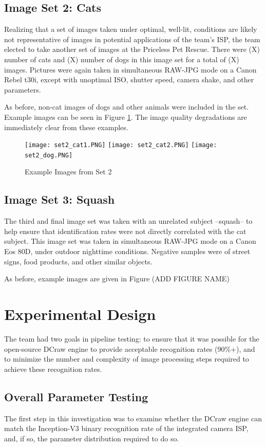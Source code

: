 \documentclass{report}
\begin{document}
		\subsection{Image Set 2: Cats}
		Realizing that a set of images taken under optimal, well-lit, conditions are likely not representative of images in potential applications of the team's ISP, the team elected to take another set of images at the Priceless Pet Rescue. There were (X) number of cats and (X) number of dogs in this image set for a total of (X) images. Pictures were again taken in simultaneous RAW-JPG mode on a Canon Rebel t30i, except with unoptimal ISO, shutter speed, camera shake, and other parameters.
		
		As before, non-cat images of dogs and other animals were included in the set. Example images can be seen in Figure \ref{set2}. The image quality degradations are immediately clear from these examples.

		\begin{figure}[h]
			\begin{center}
				\caption{Example Images from Set 2}
				\label{set2}
				\texttt{[image: set2\_cat1.PNG]}
				\texttt{[image: set2\_cat2.PNG]}
				\texttt{[image: set2\_dog.PNG]}
			\end{center}
		\end{figure}		
		
		\subsection{Image Set 3: Squash}
		The third and final image set was taken with an unrelated subject --squash-- to help ensure that identification rates were not directly correlated with the cat subject. This image set was taken in simultaneous RAW-JPG mode on a Canon Eos 80D, under outdoor nighttime conditions. Negative samples were of street signs, food products, and other similar objects.
		
		As before, example images are given in Figure (ADD FIGURE NAME)
	\section{Experimental Design}
		The team had two goals in pipeline testing: to ensure that it was possible for the open-source DCraw engine to provide acceptable recognition rates (90\%+), and to minimize the number and complexity of image processing steps required to achieve these recognition rates.
		\subsection{Overall Parameter Testing}
		The first step in this investigation was to examine whether the DCraw engine can match the Inception-V3 binary recognition rate of the integrated camera ISP, and, if so, the parameter distribution required to do so.
		
\end{document}
